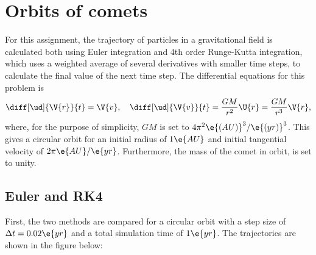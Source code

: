 \documentclass[a4paper,10pt]{article} 	%
\numberwithin{equation}{section}
\begin{document}
 	
 	\section{Orbits of comets}
 	For this assignment, the trajectory of particles in a gravitational field is calculated both using Euler integration and 4th order Runge-Kutta integration, which uses a weighted average of several derivatives with smaller time steps, to calculate the final value of the next time step. The differential equations for this problem is
 	\begin{equation}\label{key}
 		\diff[\ud]{\V{r}}{t} = \V{v}, \quad \diff[\ud]{\V{v}}{t} = \frac{GM}{r^2}\U{r} = \frac{GM}{r^3}\V{r},
 	\end{equation}
 	where, for the purpose of simplicity, $ GM $ is set to $ 4\pi^2 \e{(AU)}^3/\e{(yr)}^3 $. This gives a circular orbit for an initial radius of $ 1 \e{AU} $ and initial tangential velocity of $ 2 \pi \e{AU}/\e{yr} $. Furthermore, the mass of the comet in orbit, is set to unity. 
 	
 	\subsection{Euler and RK4}
 	First, the two methods are compared for a circular orbit with a step size of $ \Delta t = 0.02 \e{yr} $ and a total simulation time of $ 1 \e{yr} $. The trajectories are shown in the figure below:
 	
\end{document}
